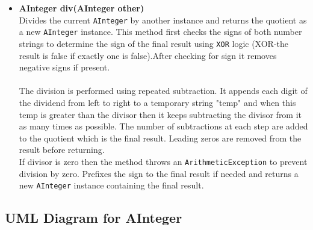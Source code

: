 \documentclass{article}
\begin{document}
\begin{itemize}
    \item \textbf{AInteger div(AInteger other)} \\
    Divides the current \texttt{AInteger} by another instance and returns the quotient as a new \texttt{AInteger} instance. This method first checks the signs of both number strings to determine the sign of the final result using \texttt{XOR} logic (XOR-the result is false if exactly one is false).After checking for sign it removes negative signs if present.\\ \\
    The division is performed using repeated subtraction. It appends each digit of the dividend from left to right to a temporary string "temp" and when this temp is greater than the divisor then it keeps subtracting the divisor from it as many times as possible. The number of subtractions at each step are added to the quotient which is the final result. Leading zeros are removed from the result before returning.\\ 
    If divisor is zero then the method throws an \texttt{ArithmeticException} to prevent division by zero.
    Prefixes the sign to the final result if needed and returns a new \texttt{AInteger} instance containing the final result.
    
\end{itemize}
\subsection*{UML Diagram for AInteger}
\end{document}
